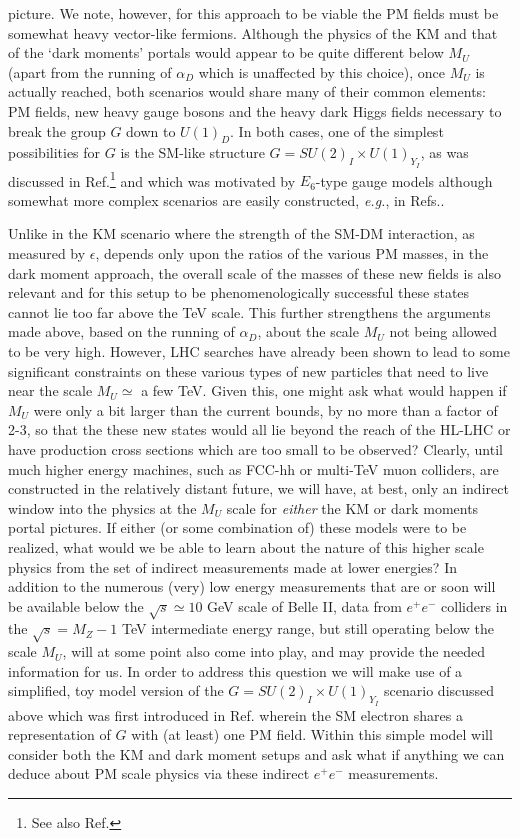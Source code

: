 \documentclass[14pt]{article}
\def\eg{{\it e.g.}}
\begin{document}
picture. We note, however, for this approach to be viable the PM fields must be somewhat heavy vector-like fermions\cite{CarcamoHernandez:2023wzf}.
Although the physics of the KM and that of the `dark moments' portals would appear to be quite different below $M_U$ (apart from the running of $\alpha_D$ which is unaffected by this choice), 
once $M_U$ is actually reached, both scenarios would share many of their common elements: PM fields, new heavy gauge bosons and the heavy dark Higgs fields necessary to break the group 
$G$ down to $U(1)_D$. In both cases, one of the simplest possibilities for $G$ is the SM-like structure $G=SU(2)_I\times U(1)_{Y_I}$, as was discussed in 
Ref.\cite{Rueter:2019wdf}\footnote{See also Ref.\cite{Bauer:2022nwt}} and which was motivated by $E_6$-type gauge models\cite{Hewett:1988xc} 
although somewhat more complex scenarios are easily constructed, \eg, in Refs.\cite{Wojcik:2020wgm,Rizzo:2023qbj,Rizzo:2023kvy}. 

Unlike in the KM scenario where the strength of the SM-DM interaction, as measured by $\epsilon$, depends only upon the ratios of the various PM masses, in the dark moment approach, the 
overall scale of the masses of these new fields is also relevant and for this setup to be phenomenologically successful these states cannot lie too far above the TeV scale. This further 
strengthens the arguments made above, based on the running of $\alpha_D$, about the scale $M_U$ not being allowed to be very high. However, 
LHC searches have already been shown to lead to some significant constraints on these various types of new particles that need to live near the scale $M_U\simeq$ a few TeV. Given this, one might 
ask what would happen if $M_U$ were only a bit larger than the current bounds, by no more than a factor of 2-3, so that the these new states would all lie beyond the reach of the HL-LHC 
or have production cross sections which are too small to be observed? Clearly, until much higher energy machines, such as FCC-hh or multi-TeV muon colliders, are constructed in the relatively 
distant future, we will have, 
at best, only an indirect window into the physics at the $M_U$ scale for {\it either} the KM or dark moments portal pictures. If either (or some combination of) these models were 
to be realized, what would we be able to learn about the nature of this higher scale physics from the set of  indirect measurements made at lower energies? In addition to the numerous (very) 
low energy measurements that are or soon will be available below the $\sqrt s \simeq 10$ GeV scale of Belle II, data from $e^+e^-$ colliders in the $\sqrt s=M_Z-1$ TeV intermediate energy range, but still operating below the scale $M_U$, will at some point also come into play, and may provide the needed information for us. In order to address this question we will make use of a simplified, 
toy model version of the $G=SU(2)_I\times U(1)_{Y_I}$ scenario discussed above which was first introduced in Ref.\cite{Rizzo:2021lob} wherein the SM electron shares a representation of $G$ 
with (at least) one PM field. Within this simple model will consider both the KM and dark moment setups and ask what if anything we can deduce about PM scale physics via these indirect 
$e^+e^-$ measurements. 
\end{document}
